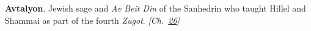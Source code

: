\textbf{Avtalyon}. Jewish sage and \emph{Av Beit Din} of the Sanhedrin who taught Hillel and Shammai as part of the fourth \emph{Zugot}. \emph{[Ch.~\hyperref[ch:jewishcalendar]{26}]}

